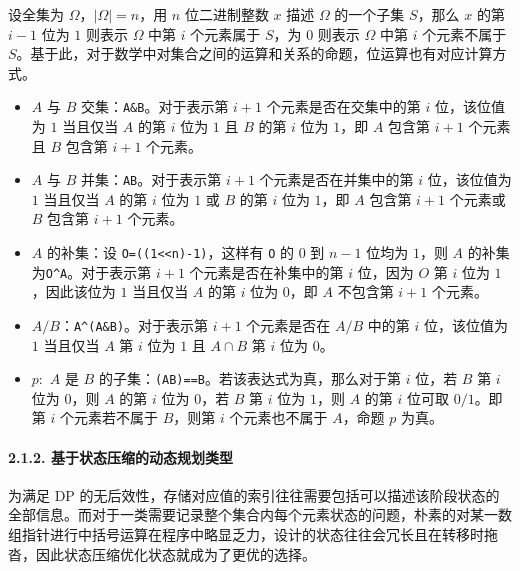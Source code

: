 设全集为 \(\Omega\)，\(|\Omega|=n\)，用 \(n\) 位二进制整数 \(x\) 描述
\(\Omega\) 的一个子集 \(S\)，那么 \(x\) 的第 \(i-1\) 位为 \(1\) 则表示
\(\Omega\) 中第 \(i\) 个元素属于 \(S\)，为 \(0\) 则表示 \(\Omega\) 中第
\(i\) 个元素不属于
\(S\)。基于此，对于数学中对集合之间的运算和关系的命题，位运算也有对应计算方式。

\begin{itemize}
\tightlist
\item
  \(A\) 与 \(B\) 交集：\texttt{A\&B}。对于表示第 \(i+1\)
  个元素是否在交集中的第 \(i\) 位，该位值为 \(1\) 当且仅当 \(A\) 的第
  \(i\) 位为 \(1\) 且 \(B\) 的第 \(i\) 位为 \(1\)，即 \(A\) 包含第
  \(i+1\) 个元素且 \(B\) 包含第 \(i+1\) 个元素。
\item
  \(A\) 与 \(B\) 并集：\texttt{A\textbar{}B}。对于表示第 \(i+1\)
  个元素是否在并集中的第 \(i\) 位，该位值为 \(1\) 当且仅当 \(A\) 的第
  \(i\) 位为 \(1\) 或 \(B\) 的第 \(i\) 位为 \(1\)，即 \(A\) 包含第
  \(i+1\) 个元素或 \(B\) 包含第 \(i+1\) 个元素。
\item
  \(A\) 的补集：设 \texttt{O=((1\textless{}\textless{}n)-1)}，这样有
  \texttt{O} 的 \(0\) 到 \(n-1\) 位均为 \(1\)，则 \(A\)
  的补集为\texttt{O\^{}A}。对于表示第 \(i+1\) 个元素是否在补集中的第
  \(i\) 位，因为 \(O\) 第 \(i\) 位为 \(1\)，因此该位为 \(1\) 当且仅当
  \(A\) 的第 \(i\) 位为 \(0\)，即 \(A\) 不包含第 \(i+1\) 个元素。
\item
  \(A/B\)：\texttt{A\^{}(A\&B)}。对于表示第 \(i+1\) 个元素是否在 \(A/B\)
  中的第 \(i\) 位，该位值为 \(1\) 当且仅当 \(A\) 第 \(i\) 位为 \(1\) 且
  \(A\cap B\) 第 \(i\) 位为 \(0\)。
\item
  \(p:\) \(A\) 是 \(B\)
  的子集：\texttt{(A\textbar{}B)==B}。若该表达式为真，那么对于第 \(i\)
  位，若 \(B\) 第 \(i\) 位为 \(0\)，则 \(A\) 的第 \(i\) 位为 \(0\)，若
  \(B\) 第 \(i\) 位为 \(1\)，则 \(A\) 的第 \(i\) 位可取 \(0/1\)。即第
  \(i\) 个元素若不属于 \(B\)，则第 \(i\) 个元素也不属于 \(A\)，命题
  \(p\) 为真。
\end{itemize}

\paragraph{2.1.2. 基于状态压缩的动态规划类型}

为满足 DP
的无后效性，存储对应值的索引往往需要包括可以描述该阶段状态的全部信息。而对于一类需要记录整个集合内每个元素状态的问题，朴素的对某一数组指针进行中括号运算在程序中略显乏力，设计的状态往往会冗长且在转移时拖沓，因此状态压缩优化状态就成为了更优的选择。


